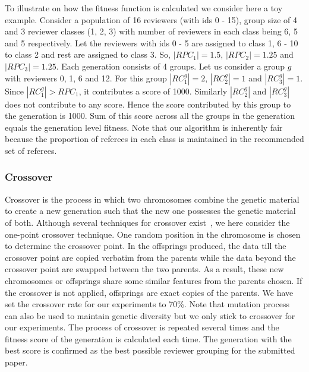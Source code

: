 To illustrate on how the fitness function is calculated we consider here a toy example. Consider a population of 16 reviewers (with ids 0 - 15), group size of 4 and 3 reviewer classes (1, 2, 3) with number of reviewers in each class being 6, 5 and 5 respectively. Let the reviewers with ids 0 - 5 are assigned to class 1, 6 - 10 to class 2 and rest are assigned to class 3. 
So, $|RPC_1| = 1.5$, $|RPC_2| = 1.25$ and $|RPC_3| = 1.25$.
Each generation consists of 4 groups. Let us consider a group $g$ with reviewers 0, 1, 6 and 12. For this group  $|RC_1^{g}| = 2$, $|RC_2^{g}| = 1$ and $|RC_3^{g}| = 1$. Since $|RC_1^{g}| > RPC_1$, it contributes a score of 1000. Similarly $|RC_2^{g}|$ and $|RC_3^{g}|$ does not contribute to any score. 
Hence the score contributed by this group to the generation is 1000. Sum of this score across all the groups in the generation equals the generation level fitness. 
Note that our algorithm is inherently fair because the proportion of referees in each class is maintained in the recommended set of referees.

\subsubsection{Crossover}
Crossover is the process in which two chromosomes combine the genetic material to create a new generation such that the new one possesses the genetic material of both. 
Although several techniques for crossover exist~\cite{golberg1989genetic}, we here consider the one-point crossover technique. 
One random position in the chromosome is chosen to determine the crossover point. In the offsprings produced, the data till the crossover point are copied verbatim from the parents while the data beyond the crossover point are swapped between the two parents. As a result, these new chromosomes or
offsprings share some similar features from the parents chosen. If the crossover is not applied, offsprings are exact copies
of the parents. We have set the crossover rate for our experiments to 70\%. 
Note that mutation process can also be used to maintain genetic diversity but we only stick to crossover for our experiments. 
The process of crossover is repeated several times and the fitness score of the generation is calculated each time. The generation 
with the best score is confirmed as the best possible reviewer grouping for the submitted paper.


